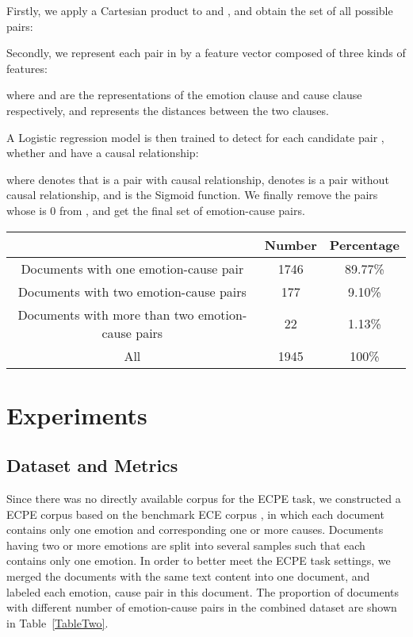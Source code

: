 \documentclass[11pt,a4paper]{article}
\begin{document}
Firstly, we apply a Cartesian product to  and , and obtain the set of all possible pairs:


Secondly, we represent each pair in  by a feature vector composed of three kinds of features:



where   and  are the representations of the emotion clause and cause clause respectively, and  represents the distances between the two clauses.

A Logistic regression model is then trained to detect for each candidate pair , whether  and  have a causal relationship:


where  denotes that  is a pair with causal relationship,   denotes  is a pair without causal relationship, and  is the Sigmoid function.
We finally remove the pairs whose  is 0 from , and get the final set of emotion-cause pairs.




\begin{table*}
	\small
	\centering
	\begin{tabular} {c|c|c}
		\hline   & Number & Percentage\\
		\hline
		Documents with one emotion-cause pair & 1746 & 89.77\% \\
		Documents with two emotion-cause pairs &	177 &	9.10\% \\
		Documents with more than two emotion-cause pairs &	22 &	1.13\% \\
		All &	1945 &	100\% \\
		\hline
	\end{tabular}
	\caption{The proportion of documents with different number of emotion-cause pairs in the merged dataset. }
	\label{TableTwo}
\end{table*}

\section{Experiments}

\subsection{Dataset and Metrics}
Since there was no directly available corpus for the ECPE task, we constructed a ECPE corpus based on the benchmark ECE corpus  \cite{gui2016event}, in which each document contains only one emotion and corresponding one or more causes. Documents having two or more emotions are split into several samples such that each contains only one emotion. In order to better meet the ECPE task settings, we merged the documents with the same text content into one document, and labeled each {emotion, cause} pair in this document. The proportion of documents with different number of emotion-cause pairs in the combined dataset are shown in Table~\ref{TableTwo}.
\end{document}
